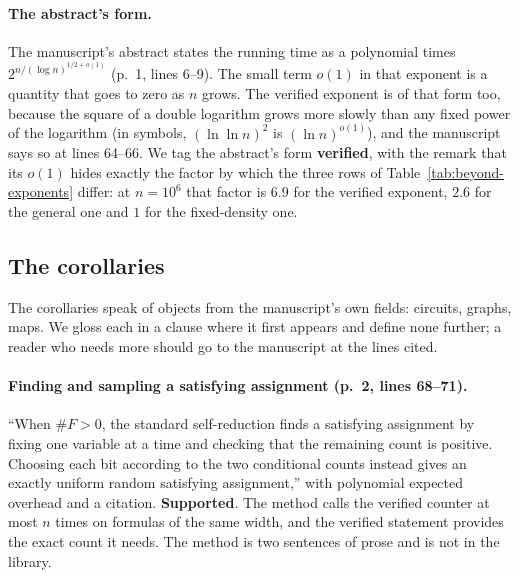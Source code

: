 \paragraph{The abstract's form.}
The manuscript's abstract states the running time as a polynomial times
$2^{n/(\log n)^{1/2+o(1)}}$ (p.~1, lines 6--9). The small term $o(1)$ in
that exponent is a quantity that goes to zero as $n$ grows. The verified exponent is of that form too, because the square of a double logarithm grows more slowly than any fixed power of the logarithm (in symbols, $(\ln\ln n)^2$ is $(\ln n)^{o(1)}$), and the manuscript says so at lines 64--66. We tag the
abstract's form \textbf{verified}, with the remark that its $o(1)$
hides exactly the factor by which the three rows of
Table~\ref{tab:beyond-exponents} differ: at $n = 10^6$ that factor is
$6.9$ for the verified exponent, $2.6$ for the general one and $1$ for
the fixed-density one.

\subsection{The corollaries}
\label{sec:beyond-corollaries}

The corollaries speak of objects from the manuscript's own fields:
circuits, graphs, maps. We gloss each in a clause where it first appears
and define none further; a reader who needs more should go to the
manuscript at the lines cited.
\paragraph{Finding and sampling a satisfying assignment (p.~2, lines 68--71).}
``When $\#F > 0$, the standard self-reduction finds a satisfying
assignment by fixing one variable at a time and checking that the
remaining count is positive. Choosing each bit according to the two
conditional counts instead gives an exactly uniform random satisfying
assignment,'' with polynomial expected overhead and a citation.
\textbf{Supported}. The method calls the verified counter at most $n$
times on formulas of the same width, and the verified statement
provides the exact count it needs. The method is two sentences of prose
and is not in the library.


